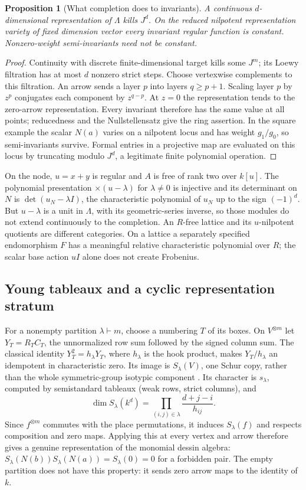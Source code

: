 \documentclass[11pt]{article}
\newtheorem{proposition}[theorem]{Proposition}
\theoremstyle{definition}\newtheorem{definition}[theorem]{Definition}
\theoremstyle{remark}\newtheorem{remark}[theorem]{Remark}
\begin{document}
\begin{proposition}[What completion does to invariants]\label{thm:nilpotent}
A continuous $d$-dimensional representation of $\Lambda$ kills $J^d$. On the reduced nilpotent representation variety of fixed dimension vector every invariant regular function is constant. Nonzero-weight semi-invariants need not be constant.
\end{proposition}
\begin{proof}
Continuity with discrete finite-dimensional target kills some $J^m$; its Loewy filtration has at most $d$ nonzero strict steps. Choose vertexwise complements to this filtration. An arrow sends a layer $p$ into layers $q\ge p+1$. Scaling layer $p$ by $z^p$ conjugates each component by $z^{q-p}$. At $z=0$ the representation tends to the zero-arrow representation. Every invariant therefore has the same value at all points; reducedness and the Nullstellensatz give the ring assertion. In the square example the scalar $N(a)$ varies on a nilpotent locus and has weight $g_1/g_0$, so semi-invariants survive. Formal entries in a projective map are evaluated on this locus by truncating modulo $J^d$, a legitimate finite polynomial operation.
\end{proof}
On the node, $u=x+y$ is regular and $A$ is free of rank two over $k[u]$. The polynomial presentation $\times(u-\lambda)$ for $\lambda\ne0$ is injective and its determinant on $N$ is $\det(u_N-\lambda I)$, the characteristic polynomial of $u_N$ up to the sign $(-1)^d$. But $u-\lambda$ is a unit in $\Lambda$, with its geometric-series inverse, so those modules do not extend continuously to the completion. An $R$-free lattice and its $u$-nilpotent quotients are different categories. On a lattice a separately specified endomorphism $F$ has a meaningful relative characteristic polynomial over $R$; the scalar base action $uI$ alone does not create Frobenius.

\subsection{Young tableaux and a cyclic representation stratum}
For a nonempty partition $\lambda\vdash m$, choose a numbering $T$ of its boxes. On $V^{\otimes m}$ let $Y_T=R_TC_T$, the unnormalized row sum followed by the signed column sum. The classical identity $Y_T^2=h_\lambda Y_T$, where $h_\lambda$ is the hook product, makes $Y_T/h_\lambda$ an idempotent in characteristic zero. Its image is $S_\lambda(V)$, one Schur copy, rather than the whole symmetric-group isotypic component \cite{Etingof,SchurComplexes}. Its character is $s_\lambda$, computed by semistandard tableaux (weak rows, strict columns), and
\[
 \dim S_\lambda(k^d)=\prod_{(i,j)\in\lambda}\frac{d+j-i}{h_{ij}}.
\]
Since $f^{\otimes m}$ commutes with the place permutations, it induces $S_\lambda(f)$ and respects composition and zero maps. Applying this at every vertex and arrow therefore gives a genuine representation of the monomial dessin algebra: $S_\lambda(N(b))S_\lambda(N(a))=S_\lambda(0)=0$ for a forbidden pair. The empty partition does not have this property: it sends zero arrow maps to the identity of $k$.
\end{document}
